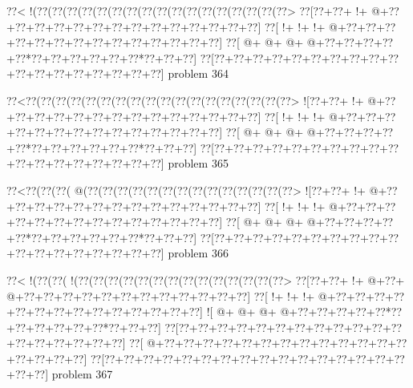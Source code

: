 \vbox{\vbox{\goo
\0??<\- !(\0??(\0??(\0??(\0??(\0??(\0??(\0??(\0??(\0??(\0??(\0??(\0??(\0??(\0??(\0??(\0??(\0??>
\0??[\0??+\0??+\- !+\- @+\0??+\0??+\0??+\0??+\0??+\0??+\0??+\0??+\0??+\0??+\0??+\0??+\0??+\0??]
\0??[\- !+\- !+\- !+\- @+\0??+\0??+\0??+\0??+\0??+\0??+\0??+\0??+\0??+\0??+\0??+\0??+\0??+\0??]
\0??[\- @+\- @+\- @+\- @+\0??+\0??+\0??+\0??+\0??*\0??+\0??+\0??+\0??+\0??+\0??*\0??+\0??+\0??]
\0??[\0??+\0??+\0??+\0??+\0??+\0??+\0??+\0??+\0??+\0??+\0??+\0??+\0??+\0??+\0??+\0??+\0??+\0??]
}
\hfil problem 364\hfil\break
}



\vbox{\vbox{\goo
\0??<\0??(\0??(\0??(\0??(\0??(\0??(\0??(\0??(\0??(\0??(\0??(\0??(\0??(\0??(\0??(\0??(\0??(\0??>
\- ![\0??+\0??+\- !+\- @+\0??+\0??+\0??+\0??+\0??+\0??+\0??+\0??+\0??+\0??+\0??+\0??+\0??+\0??]
\0??[\- !+\- !+\- !+\- @+\0??+\0??+\0??+\0??+\0??+\0??+\0??+\0??+\0??+\0??+\0??+\0??+\0??+\0??]
\0??[\- @+\- @+\- @+\- @+\0??+\0??+\0??+\0??+\0??*\0??+\0??+\0??+\0??+\0??+\0??*\0??+\0??+\0??]
\0??[\0??+\0??+\0??+\0??+\0??+\0??+\0??+\0??+\0??+\0??+\0??+\0??+\0??+\0??+\0??+\0??+\0??+\0??]
}
\hfil problem 365\hfil\break
}



\vbox{\vbox{\goo
\0??<\0??(\0??(\0??(\- @(\0??(\0??(\0??(\0??(\0??(\0??(\0??(\0??(\0??(\0??(\0??(\0??(\0??(\0??>
\- ![\0??+\0??+\- !+\- @+\0??+\0??+\0??+\0??+\0??+\0??+\0??+\0??+\0??+\0??+\0??+\0??+\0??+\0??]
\0??[\- !+\- !+\- !+\- @+\0??+\0??+\0??+\0??+\0??+\0??+\0??+\0??+\0??+\0??+\0??+\0??+\0??+\0??]
\0??[\- @+\- @+\- @+\- @+\0??+\0??+\0??+\0??+\0??*\0??+\0??+\0??+\0??+\0??+\0??*\0??+\0??+\0??]
\0??[\0??+\0??+\0??+\0??+\0??+\0??+\0??+\0??+\0??+\0??+\0??+\0??+\0??+\0??+\0??+\0??+\0??+\0??]
}
\hfil problem 366\hfil\break
}



\vbox{\vbox{\goo
\0??<\- !(\0??(\0??(\- !(\0??(\0??(\0??(\0??(\0??(\0??(\0??(\0??(\0??(\0??(\0??(\0??(\0??(\0??>
\0??[\0??+\0??+\- !+\- @+\0??+\- @+\0??+\0??+\0??+\0??+\0??+\0??+\0??+\0??+\0??+\0??+\0??+\0??]
\0??[\- !+\- !+\- !+\- @+\0??+\0??+\0??+\0??+\0??+\0??+\0??+\0??+\0??+\0??+\0??+\0??+\0??+\0??]
\- ![\- @+\- @+\- @+\- @+\0??+\0??+\0??+\0??+\0??*\0??+\0??+\0??+\0??+\0??+\0??*\0??+\0??+\0??]
\0??[\0??+\0??+\0??+\0??+\0??+\0??+\0??+\0??+\0??+\0??+\0??+\0??+\0??+\0??+\0??+\0??+\0??+\0??]
\0??[\- @+\0??+\0??+\0??+\0??+\0??+\0??+\0??+\0??+\0??+\0??+\0??+\0??+\0??+\0??+\0??+\0??+\0??]
\0??[\0??+\0??+\0??+\0??+\0??+\0??+\0??+\0??+\0??+\0??+\0??+\0??+\0??+\0??+\0??+\0??+\0??+\0??]
}
\hfil problem 367\hfil\break
}



